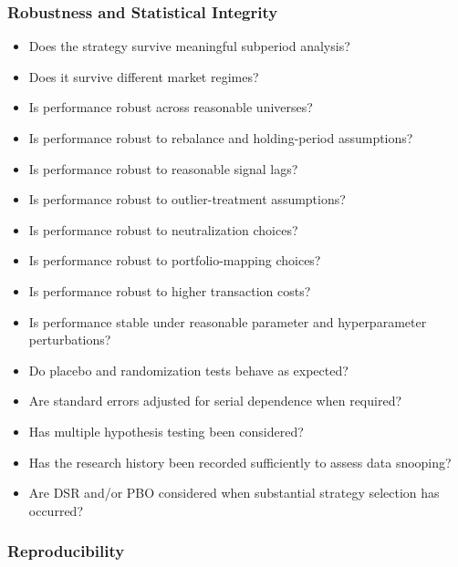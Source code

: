 \documentclass[11pt,a4paper]{article}
\begin{document}
\subsubsection{Robustness and Statistical Integrity}

\begin{itemize}
    \item[$\square$] Does the strategy survive meaningful subperiod analysis?
    \item[$\square$] Does it survive different market regimes?
    \item[$\square$] Is performance robust across reasonable universes?
    \item[$\square$] Is performance robust to rebalance and holding-period
    assumptions?
    \item[$\square$] Is performance robust to reasonable signal lags?
    \item[$\square$] Is performance robust to outlier-treatment assumptions?
    \item[$\square$] Is performance robust to neutralization choices?
    \item[$\square$] Is performance robust to portfolio-mapping choices?
    \item[$\square$] Is performance robust to higher transaction costs?
    \item[$\square$] Is performance stable under reasonable parameter and
    hyperparameter perturbations?
    \item[$\square$] Do placebo and randomization tests behave as expected?
    \item[$\square$] Are standard errors adjusted for serial dependence when
    required?
    \item[$\square$] Has multiple hypothesis testing been considered?
    \item[$\square$] Has the research history been recorded sufficiently to
    assess data snooping?
    \item[$\square$] Are DSR and/or PBO considered when substantial strategy
    selection has occurred?
\end{itemize}


\subsubsection{Reproducibility}
\end{document}

